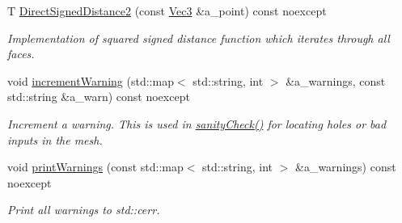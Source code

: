 \begin{DoxyCompactItemize}
T \hyperlink{classDcel_1_1MeshT_ac00a6da46649246a3a2db70b29bb2407}{Direct\+Signed\+Distance2} (const \hyperlink{classDcel_1_1MeshT_a646c5d8f66b3079bca35fe4186493627}{Vec3} \&a\+\_\+point) const noexcept
\begin{DoxyCompactList}\small\item\em Implementation of squared signed distance function which iterates through all faces. \end{DoxyCompactList}\item 
void \hyperlink{classDcel_1_1MeshT_ae13801eefa60ad08ff1da0df1da34784}{increment\+Warning} (std\+::map$<$ std\+::string, int $>$ \&a\+\_\+warnings, const std\+::string \&a\+\_\+warn) const noexcept
\begin{DoxyCompactList}\small\item\em Increment a warning. This is used in \hyperlink{classDcel_1_1MeshT_a1814ba63c6e0d7a007ee78c24d6ea159}{sanity\+Check()} for locating holes or bad inputs in the mesh. \end{DoxyCompactList}\item 
\mbox{\label{classDcel_1_1MeshT_a7115bea1b9d776a5f9c82a1e4fe852a0}} 
void \hyperlink{classDcel_1_1MeshT_a7115bea1b9d776a5f9c82a1e4fe852a0}{print\+Warnings} (const std\+::map$<$ std\+::string, int $>$ \&a\+\_\+warnings) const noexcept
\begin{DoxyCompactList}\small\item\em Print all warnings to std\+::cerr. \end{DoxyCompactList}\end{DoxyCompactItemize}
